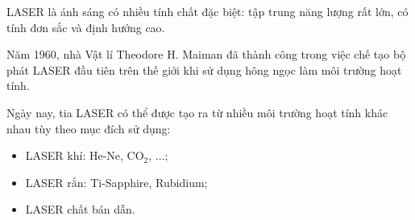 LASER là ánh sáng có nhiều tính chất đặc biệt: tập trung năng lượng rất lớn, có tính đơn sắc và định hướng cao.

Năm 1960, nhà Vật lí Theodore H. Maiman đã thành công trong việc chế tạo bộ phát LASER đầu tiên trên thế giới khi sử dụng hông ngọc làm môi trường hoạt tính.



Ngày nay, tia LASER có thể được tạo ra từ nhiều môi trường hoạt tính khác nhau tùy theo mục đích sử dụng:
\begin{itemize}
	\item LASER khí: He-Ne, CO$_2$, $\ldots$;
	\item LASER rắn: Ti-Sapphire, Rubidium;
	\item LASER chất bán dẫn.
\end{itemize}

